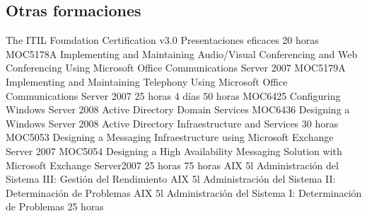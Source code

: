 \documentclass[11pt,a4paper]{moderncv}
\begin{document}
\subsection{Otras formaciones}
 {\scriptsize{
The ITIL Foundation Certification v3.0\newline
Presentaciones eficaces}}
 {20 horas}{\scriptsize{
MOC5178A Implementing and Maintaining Audio/Visual Conferencing and Web Conferencing Using Microsoft Office Communications Server 2007\newline
MOC5179A Implementing and Maintaining Telephony Using Microsoft Office Communications Server 2007}}
 {25 horas}{}
 {4 d\'ias}{}
 {50 horas}{\scriptsize{
MOC6425 Configuring Windows Server 2008 Active Directory Domain Services \newline
MOC6436 Designing a Windows Server 2008 Active Directory Infraestructure and Services}}
 {30 horas}{\scriptsize{
MOC5053 Designing a Messaging Infraestructure using Microsoft Exchange Server 2007\newline
MOC5054 Designing a High Availability Messaging Solution with Microsoft Exchange Server2007}}
 {25 horas}{}
 {75 horas}{\scriptsize{
AIX 5l Administraci\'on del Sistema III: Gesti\'on del Rendimiento\newline
AIX 5l Administraci\'on del Sistema II: Determinaci\'on de Problemas\newline
AIX 5l Administraci\'on del Sistema I: Determinaci\'on de Problemas}}
 {25 horas}{} 
\end{document}

